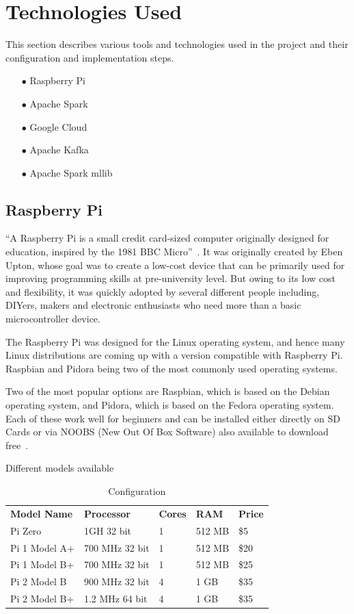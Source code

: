 \section{Technologies Used}
This section describes various tools and technologies used in the project and their configuration and implementation steps.

\begin{itemize}
	\item[$\bullet$] Raspberry Pi 
	\item[$\bullet$] Apache Spark 
	\item[$\bullet$] Google Cloud
	\item[$\bullet$] Apache Kafka	
	\item[$\bullet$] Apache Spark mllib	
\end{itemize}

\subsection{Raspberry Pi}
``A Raspberry Pi is a small credit card-sized computer originally designed for education, inspired by the 1981 BBC Micro''~\cite{hid-sp18-510-rpi}. It was originally created by Eben Upton, whose goal was to create a low-cost device that can be primarily used for improving programming skills at pre-university level. But owing to its low cost and flexibility, it was quickly adopted by several different people including, DIYers, makers and electronic enthusiasts who need more than a basic microcontroller device\cite{hid-sp18-510-rpi}.

The Raspberry Pi was designed for the Linux operating system, and hence many Linux distributions are coming up with a version compatible with Raspberry Pi. Raspbian and Pidora being two of the most commonly used operating systems.

Two of the most popular options are Raspbian, which is based on the Debian operating system, and Pidora, which is based on the Fedora operating system. Each of these work well for beginners and can be installed either directly on SD Cards or via NOOBS (New Out Of Box Software) also available to download free~\cite{hid-sp18-510-rpi}. 

Different models available

\begin{table}[]
	\centering \caption{Configuration}\label{t:Different Pi Models}
        \begin{tabular}{lllll} 
        \textbf{Model Name} & \textbf{Processor} & \textbf{Cores} & \textbf{RAM}& \textbf{Price}
        \\ Pi Zero & 1GH 32 bit & 1 & 512 MB & \$5
        \\ Pi 1 Model A+ & 700 MHz 32 bit & 1  & 512 MB & \$20
        \\ Pi 1 Model B+ & 700 MHz 32 bit & 1 & 512 MB & \$25
        \\ Pi 2 Model B & 900 MHz 32 bit & 4 & 1 GB & \$35
        \\ Pi 2 Model B+ & 1.2 MHz 64 bit & 4 & 1 GB & \$35        
        \\
	\end{tabular}
\end{table}


